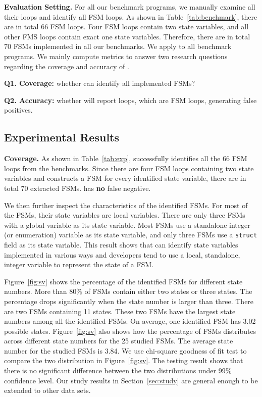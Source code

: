 \noindent\textbf{Evaluation Setting.} 
For all our benchmark programs, we manually examine all their loops and 
identify all FSM loops. 
As shown in Table~\ref{tab:benchmark}, there are in 
total 66 FSM loops.
Four FSM loops contain two state variables, 
and all other FMS loops contain exact one state variables.
Therefore, there are in total 70 FSMs implemented in all our benchmarks.  
We apply \Tool{} to all benchmark programs. 
We mainly compute metrics to answer two research 
questions regarding the coverage and accuracy of \Tool{}.

\textbf{Q1. Coverage:} whether \Tool{} can identify all implemented FSMs?
 
\textbf{Q2. Accuracy:} whether \Tool{} will report loops, which are FSM loops, 
generating false positives. 

\subsection{Experimental Results}
\label{sec:results}



\noindent\textbf{Coverage.}
As shown in Table~\ref{tab:exp}, \Tool{} successfully identifies 
all the 66 FSM loops 
from the benchmarks. Since there are four FSM loops containing 
two state variables and \Tool{} constructs a FSM for every identified state variable, 
there are in total 70 extracted FSMs. 
\Tool{} has \textbf{no} false negative.

We then further inspect the characteristics of the identified FSMs.
For most of the FSMs, their state variables are local variables.
There are only three FSMs with a global variable as its state variable. 
Most FSMs use a standalone integer (or enumeration) variable as its state variable,
and only three FSMs use a \texttt{struct} field as its state variable.  
This result shows that \Tool{} can identify state variables implemented in various ways
and developers tend to use a local, standalone, integer variable to 
represent the state of a FSM.




Figure~\ref{fig:sv} shows the percentage of the identified FSMs
for different state numbers. 
More than 80\% of FSMs contain either two states or three states. 
The percentage drops significantly when the state number is larger than three. 
There are two FSMs containing 11 states. 
These two FSMs have the largest state numbers among all the identified FSMs. 
On average, one identified FSM has 3.02 possible states. 
Figure~\ref{fig:sv} also shows how the percentage of FSMs distributes 
across different state numbers 
for the 25 studied FSMs. 
The average state number for the studied FSMs is 3.84.
We use chi-square goodness of fit test to compare 
the two distribution in Figure~\ref{fig:sv}. 
The testing result shows that there is no significant 
difference between the two distributions 
under 99\% confidence level. 
Our study results in Section~\ref{sec:study} are general enough to be 
extended to other data sets. 

